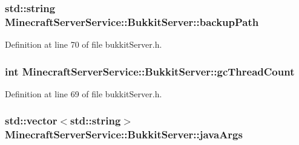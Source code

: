 \subsubsection[{\texorpdfstring{backup\+Path}{backupPath}}]{\setlength{\rightskip}{0pt plus 5cm}std\+::string Minecraft\+Server\+Service\+::\+Bukkit\+Server\+::backup\+Path\hspace{0.3cm}{\ttfamily [protected]}}\hypertarget{class_minecraft_server_service_1_1_bukkit_server_a85ee657d0612deebbd0d764f85dc70bb}{}\label{class_minecraft_server_service_1_1_bukkit_server_a85ee657d0612deebbd0d764f85dc70bb}


Definition at line 70 of file bukkit\+Server.\+h.

\subsubsection[{\texorpdfstring{gc\+Thread\+Count}{gcThreadCount}}]{\setlength{\rightskip}{0pt plus 5cm}int Minecraft\+Server\+Service\+::\+Bukkit\+Server\+::gc\+Thread\+Count\hspace{0.3cm}{\ttfamily [protected]}}\hypertarget{class_minecraft_server_service_1_1_bukkit_server_a4ed7ed606547e75eee8b442e54bcf46d}{}\label{class_minecraft_server_service_1_1_bukkit_server_a4ed7ed606547e75eee8b442e54bcf46d}


Definition at line 69 of file bukkit\+Server.\+h.

\subsubsection[{\texorpdfstring{java\+Args}{javaArgs}}]{\setlength{\rightskip}{0pt plus 5cm}std\+::vector$<$std\+::string$>$ Minecraft\+Server\+Service\+::\+Bukkit\+Server\+::java\+Args\hspace{0.3cm}{\ttfamily [protected]}}\hypertarget{class_minecraft_server_service_1_1_bukkit_server_a757f2ed305f3d06015729e429e104bea}{}\label{class_minecraft_server_service_1_1_bukkit_server_a757f2ed305f3d06015729e429e104bea}


